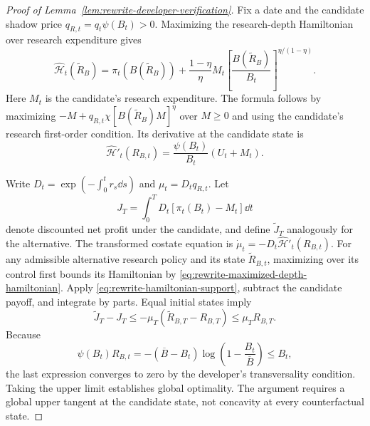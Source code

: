 \begin{proof}[Proof of Lemma~\ref{lem:rewrite-developer-verification}]
Fix a date and the candidate shadow price
$q_{R,t}=q_t\psi(B_t)>0$. Maximizing the research-depth Hamiltonian over
research expenditure gives
\begin{equation}
 \widehat{\mathcal H}_t(\widetilde R_B)
 =\pi_t(B(\widetilde R_B))+
 \frac{1-\eta}{\eta}M_t
 \left[\frac{B(\widetilde R_B)}{B_t}\right]^{\eta/(1-\eta)}.
 \label{eq:rewrite-maximized-depth-hamiltonian}
\end{equation}
Here $M_t$ is the candidate's research expenditure. The formula follows by
maximizing $-M+q_{R,t}\chi[B(\widetilde R_B)M]^\eta$ over $M\geq0$ and
using the candidate's research first-order condition. Its derivative at the
candidate state is
\begin{equation}
 \widehat{\mathcal H}'_t(R_{B,t})
 =\frac{\psi(B_t)}{B_t}(U_t+M_t).
 \label{eq:rewrite-depth-hamiltonian-slope}
\end{equation}

Write $D_t=\exp(-\int_0^t r_s\dd s)$ and $\mu_t=D_tq_{R,t}$.
Let
\[
 J_T=\int_0^T D_t[\pi_t(B_t)-M_t]\dd t
\]
denote discounted net profit under the candidate, and define
$\widetilde J_T$ analogously for the alternative.
The transformed costate equation is
$\dot\mu_t=-D_t\widehat{\mathcal H}'_t(R_{B,t})$.
For any admissible alternative research policy and its state
$\widetilde R_{B,t}$, maximizing over its control first bounds its Hamiltonian
by \eqref{eq:rewrite-maximized-depth-hamiltonian}. Apply
\eqref{eq:rewrite-hamiltonian-support}, subtract the candidate payoff, and
integrate by parts. Equal initial states imply
\[
 \widetilde J_T-J_T
 \leq-\mu_T(\widetilde R_{B,T}-R_{B,T})
 \leq\mu_TR_{B,T}.
\]
Because
\[
 \psi(B_t)R_{B,t}
 =-(\overline B-B_t)\log\left(1-\frac{B_t}{\overline B}\right)
 \leq B_t,
\]
the last expression converges to zero by
the developer's transversality condition. Taking the upper limit establishes
global optimality. The argument requires a global upper tangent at the
candidate state, not concavity at every counterfactual state.
\end{proof}


